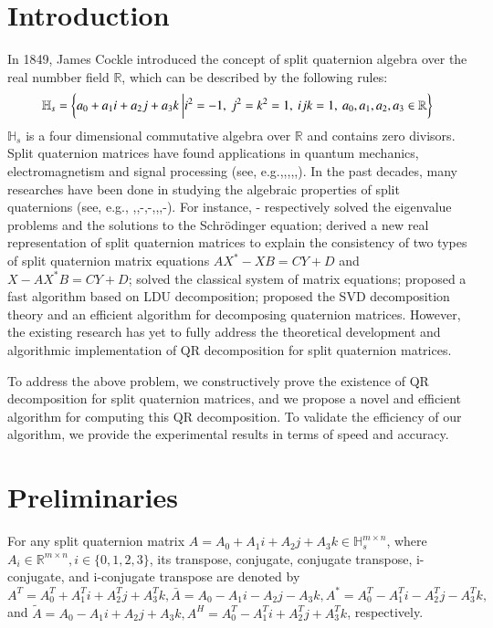 \documentclass[1p]{elsarticle}
\numberwithin{equation}{section}
\begin{document}

\section{Introduction}
In 1849, James Cockle \cite{Cockle1849} introduced the concept of split quaternion algebra over the real numbber field $\mathbb{R}$,   which can be described by the following rules:
\begin{equation*}
    \small
    \mathbb{H}_s = \left\{ a_0 + a_1 i + a_2 j + a_3 k \ \bigg| i^2 = -1,\ j^2 = k^2 = 1, \ ijk = 1, \ a_0, a_1, a_2, a_3 \in \mathbb{R} \right\} 
\end{equation*} 
$\mathbb{H}_s$ is a four dimensional commutative algebra over $\mathbb{R}$ and contains zero divisors. 
Split quaternion matrices have found applications in quantum mechanics, electromagnetism and signal processing (see, e.g.,\cite{Gog2022},\cite{Hasebe2010},\cite{Le2022},\cite{Z2022},\cite{Wang2023}). In the past decades, many researches  have been done in studying the algebraic properties of split quaternions (see, e.g., \cite{Abłamowicz2020},\cite{Yasemin2012},\cite{TJiang2015}-\cite{TJiang2018},\cite{Zhuo2020}-\cite{Xin2019},\cite{mma},\cite{wang},\cite{Wang2021}-\cite{Zhang2015}). For instance, \cite{Jiang2018}-\cite{TJiang2018} respectively solved the eigenvalue problems and the solutions to the Schrödinger equation; \cite{Xin2019} derived a new real representation of split quaternion matrices to explain the consistency of two types of split quaternion matrix equations \(AX^* - XB = CY + D\) and \(X - AX^*B = CY + D\); \cite{wang} solved the classical system of matrix equations; \cite{Wang2021} proposed a fast algorithm based on LDU decomposition;  \cite{Gang2024}  proposed the SVD decomposition theory and an efficient algorithm for decomposing quaternion matrices. However, the existing research has yet to fully address the theoretical development and algorithmic implementation of QR decomposition for split quaternion matrices.

To address the above problem, we constructively prove the existence of QR decomposition for split quaternion matrices, and we propose a novel and efficient algorithm for computing this QR decomposition.  To validate the efficiency  of our algorithm, we provide the experimental results in terms of speed and accuracy.

\section{Preliminaries}
For any split quaternion matrix ${A}=A_{0}+A_{1}i + A_{2}j + A_{3}k \in\mathbb{H}_{s}^{m\times n}$, where $A_{i}\in\mathbb{R}^{m\times n}, i\in\{0,1,2,3\}$, its transpose, conjugate, conjugate transpose, i-conjugate, and i-conjugate transpose are  denoted by 
 ${A}^T = A_0^T + A_1^Ti + A_2^Tj + A_3^Tk,\bar{{A}} = A_0 - A_1i - A_2j - A_3k, {A}^* = A_0^T - A_1^Ti - A_2^Tj - A_3^Tk,$ and $\tilde{{A}} = A_0 - A_1i + A_2j + A_3k,{A}^H = A_0^T - A_1^Ti + A_2^Tj + A_3^Tk$, respectively.
\end{document}
